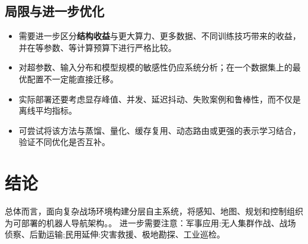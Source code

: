 \documentclass[UTF8,11pt,a4paper]{ctexart}
\newcommand{\term}[1]{\textbf{\textcolor{mainblue}{#1}}}
\begin{document}
\subsection{局限与进一步优化}
\begin{itemize}
\item 需要进一步区分\term{结构收益}与更大算力、更多数据、不同训练技巧带来的收益，并在等参数、等计算预算下进行严格比较。
\item 对超参数、输入分布和模型规模的敏感性仍应系统分析；在一个数据集上的最优配置不一定能直接迁移。
\item 实际部署还要考虑显存峰值、并发、延迟抖动、失败案例和鲁棒性，而不仅是离线平均指标。
\item 可尝试将该方法与蒸馏、量化、缓存复用、动态路由或更强的表示学习结合，验证不同优化是否互补。
\end{itemize}

\section{结论}
总体而言，面向复杂战场环境构建分层自主系统，将感知、地图、规划和控制组织为可部署的机器人导航架构。。 进一步需要注意：军事应用:无人集群作战、战场侦察、后勤运输;民用延伸:灾害救援、极地勘探、工业巡检。
\end{document}
